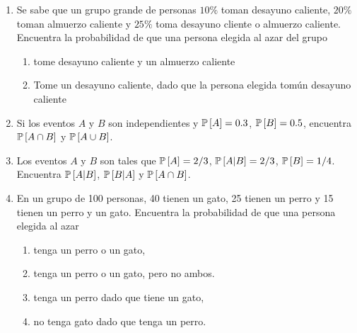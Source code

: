 \begin{Ejer}
\begin{enumerate}
\begin{enumerate}
\item Factor $Rh^{+}$ y tipo $A$,
\item Factor $Rh^{+}$ y tipo $AB$,
\item Factor $Rh^{+}$ y tipo $O$,
\item Factor $Rh^{-}$ y tipo B,
\item Factor $Rh^{-}$ y tipo $O$,
\end{enumerate}


\item Se sabe que un grupo grande de personas $10\%$ toman desayuno caliente, $20\%$ toman almuerzo caliente y $25\%$ toma desayuno cliente o almuerzo caliente. Encuentra la probabilidad de que una persona elegida al azar del grupo
\begin{enumerate}
\item tome desayuno caliente y un almuerzo caliente
\item Tome un desayuno caliente, dado que la persona elegida tom\' un desayuno caliente
\end{enumerate}

\item Si los eventos $A$ y $B$ son independientes y $\mathbb{P}\left[A\right]=0.3$, $\mathbb{P}\left[B\right]=0.5$, encuentra $\mathbb{P}\left[A\cap B\right]$ y $\mathbb{P}\left[A\cup B\right]$.

\item Los eventos $A$ y $B$ son tales que $\mathbb{P}\left[A\right]=2/3$, $\mathbb{P}\left[A|B\right]=2/3$, $\mathbb{P}\left[B\right]=1/4$. Encuentra $\mathbb{P}\left[A|B\right]$, $\mathbb{P}\left[B|A\right]$ y $\mathbb{P}\left[A\cap B\right]$.

\item En un grupo de 100 personas, 40 tienen un gato, 25 tienen un perro y 15 tienen un perro y un gato. Encuentra la probabilidad de que una persona elegida al azar
\begin{enumerate}
\item tenga un perro o un gato,
\item tenga un perro o un gato, pero no ambos.
\item tenga un perro dado que tiene un gato,
\item no tenga gato dado que tenga un perro.
\end{enumerate}
\end{enumerate}
\end{Ejer}

